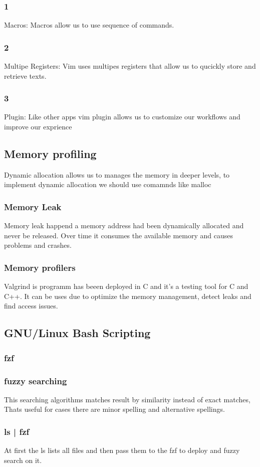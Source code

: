 \documentclass[30px]{article}
\begin{document}
\subsubsection*{1} Macros: Macros allow us to use sequence of commands.
\subsubsection*{2} Multipe Registers: Vim uses multipes registers that allow us to qucickly store and retrieve texts.
\subsubsection*{3} Plugin: Like other apps vim plugin allows us to customize our workflows and improve our exprience
\subsection{Memory profiling}
Dynamic allocation allows us to manages the memory in deeper levels, to implement dynamic allocation we should use comamnds like malloc
\subsubsection{Memory Leak}
Memory leak happend a memory address had been dynamically allocated and never be released. Over time it consumes the available memory and causes problems and crashes.
\subsubsection{Memory profilers}
Valgrind is programm has beeen deployed in C and it's a testing tool for C and C++. It can be uses due to optimize the memory management, detect leaks and find access issues.
\subsection{GNU/Linux Bash Scripting}
\subsubsection{fzf}
\subsubsection*{fuzzy searching} 
This searching algorithms matches result by similarity instead of exact matches, Thats useful for cases there are minor spelling and alternative spellings.
\subsubsection*{ls | fzf}
At first the ls lists all files and then pass them to the fzf to deploy and fuzzy search on it.
\end{document}
